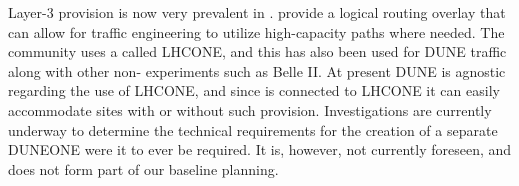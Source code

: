 \documentclass[../main-v1.tex]{subfiles}
\begin{document}
 Layer-3  provision is now very prevalent in . 
  provide a logical routing overlay that can allow for traffic engineering to utilize high-capacity paths where needed. The  community uses a  called LHCONE, and this has also been used for DUNE traffic along with other non- experiments such as Belle II. 
At present DUNE is agnostic %
regarding the use of LHCONE, and since  is connected to LHCONE it can easily accommodate sites with or without such provision.
Investigations are currently underway to determine the technical requirements for the creation of a separate DUNEONE  were it to ever be required. It is, however, not currently foreseen, and does not form part of our baseline planning.
\end{document}
